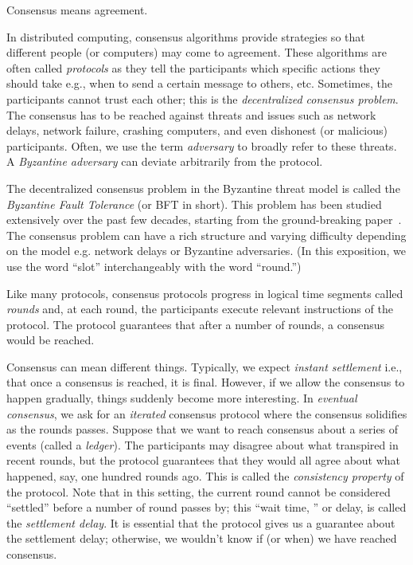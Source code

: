 




Consensus means agreement.

In distributed computing, 
consensus algorithms provide strategies 
so that different people (or computers) 
may come to agreement. 
These algorithms are often called \emph{protocols} as they 
tell the participants which specific actions they should take 
e.g., when to send a certain message to others, etc. 
Sometimes, the participants cannot trust each other; 
this is the \emph{decentralized consensus problem}. 
The consensus has to be reached against threats and issues such as 
network delays, network failure, crashing computers, and even 
dishonest (or malicious) participants. 
Often, we use the term \emph{adversary} to broadly refer to these threats. 
A \emph{Byzantine adversary} can deviate arbitrarily from the protocol. 


The decentralized consensus problem in the Byzantine threat model 
is called the \emph{Byzantine Fault Tolerance} (or BFT in short). 
This problem has been studied extensively over the past few decades, 
starting from the ground-breaking paper~\citet{BFT}. 
The consensus problem can have a rich structure and varying difficulty 
depending on the model e.g. network delays or Byzantine adversaries. 
(In this exposition, 
we use the word ``slot'' interchangeably with the word ``round.'')

Like many protocols, consensus protocols 
progress in logical time segments called \emph{rounds} 
and, at each round, the participants execute relevant instructions of the protocol. 
The protocol guarantees that after a number of rounds, 
a consensus would be reached. 

Consensus can mean different things. 
Typically, we expect \emph{instant settlement} 
i.e., that once a consensus is reached, 
it is final. 
However, if we allow the consensus to happen gradually, 
things suddenly become more interesting.
In \emph{eventual consensus}, 
we ask for an \emph{iterated} consensus protocol 
where the consensus solidifies as the rounds passes. 
Suppose that we want to reach consensus about a series of events 
(called a \emph{ledger}). 
The participants may disagree about what transpired in recent rounds, 
but the protocol guarantees that they would all agree about 
what happened, say, one hundred rounds ago. 
This is called the \emph{consistency property} of the protocol. 
Note that in this setting, 
the current round cannot be considered ``settled'' 
before a number of round passes by; 
this ``wait time, '' or delay, is called the \emph{settlement delay}. 
It is essential that the protocol gives us a guarantee 
about the settlement delay;
otherwise, we wouldn't know if (or when) we have reached consensus.

